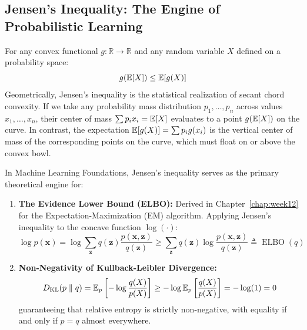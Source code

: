\subsection{Jensen's Inequality: The Engine of Probabilistic Learning}
For any convex functional $g: \mathbb{R} \to \mathbb{R}$ and any random variable $X$ defined on a probability space:
\begin{equation}
g(\operatorname{\mathbb{E}}[X]) \le \operatorname{\mathbb{E}}[g(X)]
\label{eq:jensen}
\end{equation}
Geometrically, Jensen's inequality is the statistical realization of secant chord convexity. If we take any probability mass distribution $p_1, \dots, p_n$ across values $x_1, \dots, x_n$, their center of mass $\sum p_i x_i = \operatorname{\mathbb{E}}[X]$ evaluates to a point $g(\operatorname{\mathbb{E}}[X])$ on the curve. In contrast, the expectation $\operatorname{\mathbb{E}}[g(X)] = \sum p_i g(x_i)$ is the vertical center of mass of the corresponding points on the curve, which must float on or above the convex bowl.

In Machine Learning Foundations, Jensen's inequality serves as the primary theoretical engine for:
\begin{enumerate}
    \item \textbf{The Evidence Lower Bound (ELBO):} Derived in Chapter~\ref{chap:week12} for the Expectation-Maximization (EM) algorithm. Applying Jensen's inequality to the concave function $\log(\cdot)$:
    \begin{equation}
    \log p(\mathbf{x}) = \log \sum_{\mathbf{z}} q(\mathbf{z}) \frac{p(\mathbf{x}, \mathbf{z})}{q(\mathbf{z})} \ge \sum_{\mathbf{z}} q(\mathbf{z}) \log \frac{p(\mathbf{x}, \mathbf{z})}{q(\mathbf{z})} \triangleq \operatorname{ELBO}(q)
    \end{equation}
    \item \textbf{Non-Negativity of Kullback-Leibler Divergence:}
    \begin{equation}
    D_{\mathrm{KL}}(p \parallel q) = \operatorname{\mathbb{E}}_p\left[ -\log \frac{q(X)}{p(X)} \right] \ge -\log \operatorname{\mathbb{E}}_p\left[ \frac{q(X)}{p(X)} \right] = -\log(1) = 0
    \end{equation}
    guaranteeing that relative entropy is strictly non-negative, with equality if and only if $p = q$ almost everywhere.
\end{enumerate}


